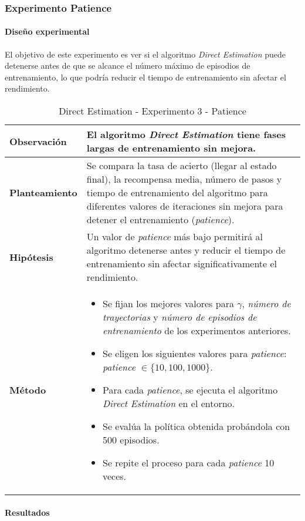 \subsubsection{Experimento Patience}

\paragraph{Diseño experimental}

El objetivo de este experimento es ver si el algoritmo \textit{Direct Estimation} puede detenerse antes de que se alcance el número máximo de episodios de entrenamiento, lo que podría reducir el tiempo de entrenamiento sin afectar el rendimiento.

\begin{table}[H]
    \centering
    \begin{tabularx}{\textwidth}{|p{4cm}|X|} %
        \hline %
        \textbf{Observación} & El algoritmo \textit{Direct Estimation} tiene fases largas de entrenamiento sin mejora.
        \\ \hline
        \textbf{Planteamiento} & Se compara la tasa de acierto (llegar al estado final), la recompensa media, número de pasos y tiempo de entrenamiento del algoritmo para diferentes valores de iteraciones sin mejora para detener el entrenamiento (\textit{patience}).
        \\ \hline
        \textbf{Hipótesis} & Un valor de \textit{patience} más bajo permitirá al algoritmo detenerse antes y reducir el tiempo de entrenamiento sin afectar significativamente el rendimiento.
        \\ \hline
        \textbf{Método} & 
        \begin{itemize}
            \item Se fijan los mejores valores para \(\gamma\), \textit{número de trayectorias} y \textit{número de episodios de entrenamiento} de los experimentos anteriores.
            \item Se eligen los siguientes valores para \textit{patience}: \textit{patience} \(\in \{10, 100, 1000\}\).
            \item Para cada \textit{patience}, se ejecuta el algoritmo \textit{Direct Estimation} en el entorno.
            \item Se evalúa la política obtenida probándola con 500 episodios.
            \item Se repite el proceso para cada \textit{patience} 10 veces.
        \end{itemize}
        \\ \hline
    \end{tabularx}
    \caption{Direct Estimation - Experimento 3 - Patience}
    \label{tab:diseñoDirectEstimationExp3}
\end{table}

\paragraph{Resultados}